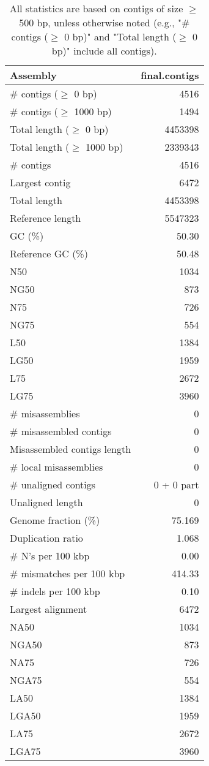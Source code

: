 \documentclass[12pt,a4paper]{article}
\begin{document}
\begin{table}[ht]
\begin{center}
\caption{All statistics are based on contigs of size $\geq$ 500 bp, unless otherwise noted (e.g., "\# contigs ($\geq$ 0 bp)" and "Total length ($\geq$ 0 bp)" include all contigs).}
\begin{tabular}{|l*{1}{|r}|}
\hline
Assembly & final.contigs \\ \hline
\# contigs ($\geq$ 0 bp) & 4516 \\ \hline
\# contigs ($\geq$ 1000 bp) & 1494 \\ \hline
Total length ($\geq$ 0 bp) & 4453398 \\ \hline
Total length ($\geq$ 1000 bp) & 2339343 \\ \hline
\# contigs & 4516 \\ \hline
Largest contig & 6472 \\ \hline
Total length & 4453398 \\ \hline
Reference length & 5547323 \\ \hline
GC (\%) & 50.30 \\ \hline
Reference GC (\%) & 50.48 \\ \hline
N50 & 1034 \\ \hline
NG50 & 873 \\ \hline
N75 & 726 \\ \hline
NG75 & 554 \\ \hline
L50 & 1384 \\ \hline
LG50 & 1959 \\ \hline
L75 & 2672 \\ \hline
LG75 & 3960 \\ \hline
\# misassemblies & 0 \\ \hline
\# misassembled contigs & 0 \\ \hline
Misassembled contigs length & 0 \\ \hline
\# local misassemblies & 0 \\ \hline
\# unaligned contigs & 0 + 0 part \\ \hline
Unaligned length & 0 \\ \hline
Genome fraction (\%) & 75.169 \\ \hline
Duplication ratio & 1.068 \\ \hline
\# N's per 100 kbp & 0.00 \\ \hline
\# mismatches per 100 kbp & 414.33 \\ \hline
\# indels per 100 kbp & 0.10 \\ \hline
Largest alignment & 6472 \\ \hline
NA50 & 1034 \\ \hline
NGA50 & 873 \\ \hline
NA75 & 726 \\ \hline
NGA75 & 554 \\ \hline
LA50 & 1384 \\ \hline
LGA50 & 1959 \\ \hline
LA75 & 2672 \\ \hline
LGA75 & 3960 \\ \hline
\end{tabular}
\end{center}
\end{table}
\end{document}
